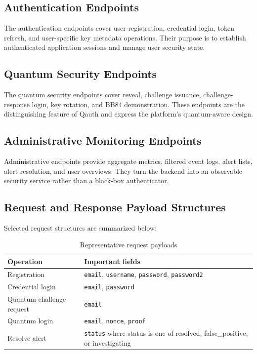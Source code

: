 \subsection{Authentication Endpoints}
The authentication endpoints cover user registration, credential login, token refresh, and user-specific key metadata operations. Their purpose is to establish authenticated application sessions and manage user security state.

\subsection{Quantum Security Endpoints}
The quantum security endpoints cover reveal, challenge issuance, challenge-response login, key rotation, and BB84 demonstration. These endpoints are the distinguishing feature of Qauth and express the platform's quantum-aware design.

\subsection{Administrative Monitoring Endpoints}
Administrative endpoints provide aggregate metrics, filtered event logs, alert lists, alert resolution, and user overviews. They turn the backend into an observable security service rather than a black-box authenticator.

\subsection{Request and Response Payload Structures}
Selected request structures are summarized below:

\begin{table}[H]
\centering
\small
\caption{Representative request payloads}
\label{tab:payloads}
\begin{tabular}{|p{3.6cm}|p{8.8cm}|}
\hline
\textbf{Operation} & \textbf{Important fields} \\
\hline
Registration & \texttt{email}, \texttt{username}, \texttt{password}, \texttt{password2} \\
\hline
Credential login & \texttt{email}, \texttt{password} \\
\hline
Quantum challenge request & \texttt{email} \\
\hline
Quantum login & \texttt{email}, \texttt{nonce}, \texttt{proof} \\
\hline
Resolve alert & \texttt{status} where status is one of resolved, false\_positive, or investigating \\
\hline
\end{tabular}
\end{table}


